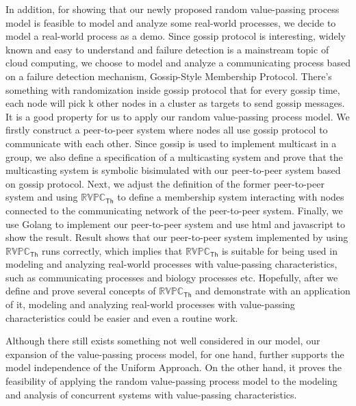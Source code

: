 \begin{digest}
   In addition, for showing that our newly proposed random value-passing process model is feasible to model and analyze some real-world processes, we decide to model a real-world process as a demo. Since gossip protocol is interesting, widely known and easy to understand and failure detection is a mainstream topic of cloud computing, we choose to model and analyze a communicating process based on a failure detection mechanism, Gossip-Style Membership Protocol. There’s something with randomization inside gossip protocol that for every gossip time, each node will pick k other nodes in a cluster as targets to send gossip messages. It is a good property for us to apply our random value-passing process model. We firstly construct a peer-to-peer system where nodes all use gossip protocol to communicate with each other. Since gossip is used to implement multicast in a group, we also define a specification of a multicasting system and prove that the multicasting system is symbolic bisimulated with our peer-to-peer system based on gossip protocol. Next, we adjust the definition of the former peer-to-peer system and using $\mathbb{RVPC}_{\mathsf{Th}}$ to define a membership system interacting with nodes connected to the communicating network of the peer-to-peer system. Finally, we use Golang to implement our peer-to-peer system and use html and javascript to show the result. Result shows that our peer-to-peer system implemented by using $\mathbb{RVPC}_{\mathsf{Th}}$ runs correctly, which implies that $\mathbb{RVPC}_{\mathsf{Th}}$ is suitable for being used in modeling and analyzing real-world processes with value-passing characteristics, such as communicating processes and biology processes etc. Hopefully, after we define and prove several concepts of $\mathbb{RVPC}_{\mathsf{Th}}$ and demonstrate with an application of it, modeling and analyzing real-world processes with value-passing characteristics could be easier and even a routine work.

  Although there still exists something not well considered in our model, our expansion of the value-passing process model, for one hand, further supports the model independence of the Uniform Approach. On the other hand, it proves the feasibility of applying the random value-passing process model to the modeling and analysis of concurrent systems with value-passing characteristics.

\end{digest}
